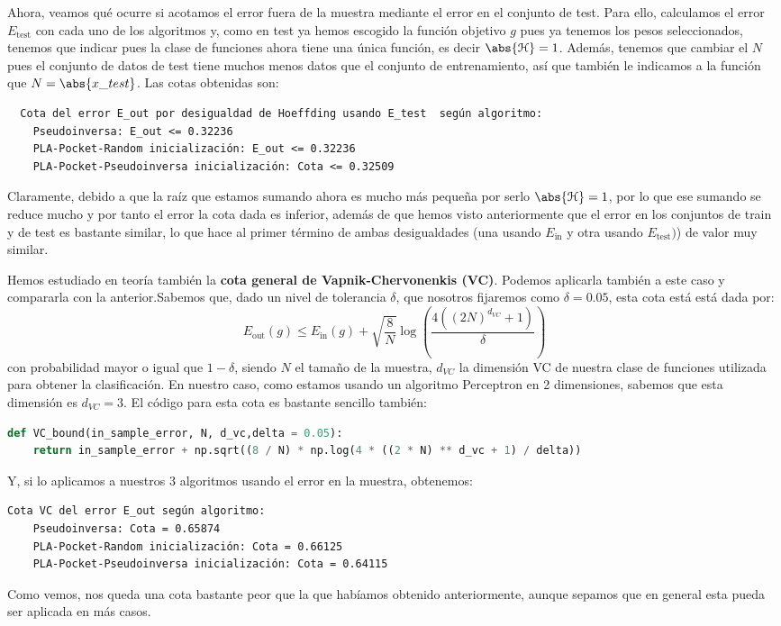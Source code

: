 \documentclass[12pt]{article}
\begin{document}
Ahora, veamos qué ocurre si acotamos el error fuera de la muestra mediante el error en el conjunto de test. Para ello, calculamos el error $E_{\operatorname{test}}$ con cada uno de los algoritmos y, como en test ya hemos escogido la función objetivo $g$ pues ya tenemos los pesos seleccionados, tenemos que indicar  pues la clase de funciones ahora tiene una única función, es decir $\abs{\mathcal H} = 1$. Además, tenemos que cambiar el $N$ pues el conjunto de datos de test tiene muchos menos datos que el conjunto de entrenamiento, así que también le indicamos a la función que $N = \abs{x\_test}$. Las cotas obtenidas son:
\begin{lstlisting}
  Cota del error E_out por desigualdad de Hoeffding usando E_test  según algoritmo:
    Pseudoinversa: E_out <= 0.32236
    PLA-Pocket-Random inicialización: E_out <= 0.32236
    PLA-Pocket-Pseudoinversa inicialización: Cota <= 0.32509
\end{lstlisting}

Claramente, debido a que la raíz que estamos sumando ahora es mucho más pequeña por serlo $\abs{\mathcal H} = 1$, por lo que ese sumando se reduce mucho y por tanto el error la cota dada es inferior, además de que hemos visto anteriormente que el error en los conjuntos de train y de test es bastante similar, lo que hace al primer término de ambas desigualdades (una usando $E_{\operatorname{in}}$ y otra usando $E_\operatorname{test})$) de valor muy similar.

Hemos estudiado en teoría también la \textbf{cota general de Vapnik-Chervonenkis (VC)}. Podemos aplicarla también a este caso y compararla con la anterior.Sabemos que, dado un nivel de tolerancia $\delta$, que nosotros fijaremos como $\delta = 0.05$, esta cota está está dada por:
$$
E_{\operatorname{out}}(g) \leq E_{\operatorname{in}}(g) + \sqrt{ \frac{8}{N}} \log \left( \frac{4((2N)^{d_{VC}}+ 1)}{\delta}\right)
$$
con probabilidad mayor o igual que $1 - \delta$, siendo $N$ el tamaño de la muestra, $d_{VC}$ la dimensión VC de nuestra clase de funciones utilizada para obtener la clasificación. En nuestro caso, como estamos usando un algoritmo Perceptron en 2 dimensiones, sabemos que esta dimensión es $d_{VC} = 3$. El código para esta cota es bastante sencillo también:
\begin{lstlisting}[language=Python]
  def VC_bound(in_sample_error, N, d_vc,delta = 0.05):
    return in_sample_error + np.sqrt((8 / N) * np.log(4 * ((2 * N) ** d_vc + 1) / delta))
\end{lstlisting}
Y, si lo aplicamos a nuestros 3 algoritmos usando el error en la muestra, obtenemos:
\begin{lstlisting}[language=bash]
  Cota VC del error E_out según algoritmo:
    Pseudoinversa: Cota = 0.65874
    PLA-Pocket-Random inicialización: Cota = 0.66125
    PLA-Pocket-Pseudoinversa inicialización: Cota = 0.64115
\end{lstlisting}
Como vemos, nos queda una cota bastante peor que la que habíamos obtenido anteriormente, aunque sepamos que en general esta pueda ser aplicada en más casos.
\end{document}
